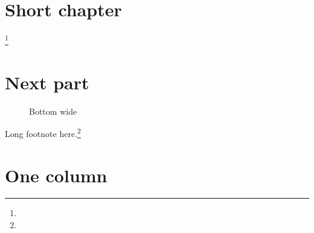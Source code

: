\documentclass{article}
\begin{document}
\section{Short chapter}
\lipsum[1-3]\footnote{\lipsum[4][1-3]}
\lipsum[5]
\evenendclearpage
\section{Next part}
\lipsum[6-9]
\begin{figure}[b]\centering\fbox{\rule{0pt}{60pt}\hspace{.8\textwidth}}\caption{Bottom wide}\end{figure}
\lipsum[10-12]
Long footnote here.\footnote{\lipsum[13]}
\lipsum[14-15]
\onecolumn
\section{One column}
\lipsum[16]
\end{document}
